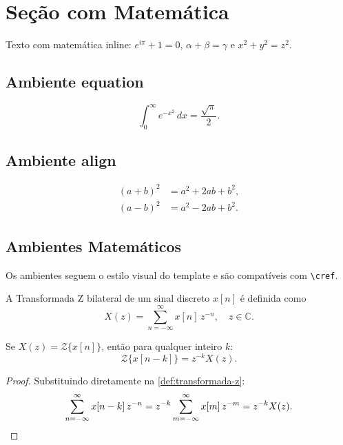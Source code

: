 \section{Seção com Matemática}

Texto com matemática inline: $e^{i\pi}+1=0$, $\alpha+\beta=\gamma$ e $x^2+y^2=z^2$.

\subsection{Ambiente equation}

\begin{equation}
  \label{eq:integral}
  \int_{0}^{\infty} e^{-x^2}\,dx = \frac{\sqrt{\pi}}{2}.
\end{equation}

\subsection{Ambiente align}

\begin{align}
  (a+b)^2 &= a^2 + 2ab + b^2, \\
  (a-b)^2 &= a^2 - 2ab + b^2.
\end{align}

\subsection{Ambientes Matemáticos}

Os ambientes seguem o estilo visual do template e são compatíveis com \verb|\cref|.

\begin{definicao}[Transformada Z]
  \label{def:transformada-z}
  A Transformada Z bilateral de um sinal discreto $x[n]$ é definida como
  \[
    X(z) = \sum_{n=-\infty}^{\infty} x[n]\, z^{-n}, \quad z \in \mathbb{C}.
  \]
\end{definicao}

\begin{teorema}
  \label{teo:deslocamento}
  Se $X(z) = \mathcal{Z}\{x[n]\}$, então para qualquer inteiro $k$:
  \[
    \mathcal{Z}\{x[n-k]\} = z^{-k} X(z).
  \]
\end{teorema}

\begin{proof}
  Substituindo diretamente na \cref{def:transformada-z}:
  \[
    \sum_{n=-\infty}^{\infty} x[n-k]\,z^{-n}
    = z^{-k} \sum_{m=-\infty}^{\infty} x[m]\,z^{-m}
    = z^{-k} X(z). \qedhere
  \]
\end{proof}

